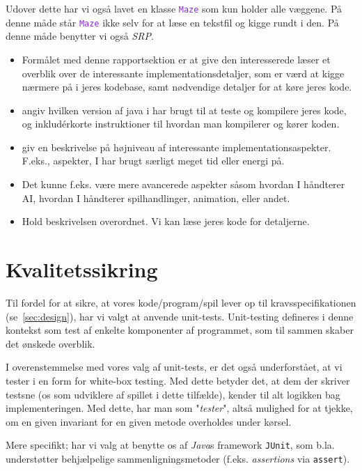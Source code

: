 \documentclass{article}
\newcommand{\code}[1]{\small\texttt{#1}}
\newcommand{\class}[1]{\textcolor{BlueViolet}{\small\texttt{#1}}}
\theoremstyle{mytheoremstyle}
\theoremstyle{mytheoremstyle}
\theoremstyle{myproblemstyle}
\begin{document}
Udover dette har vi også lavet en klasse \class{Maze} som kun holder alle
væggene. På denne måde står \class{Maze} ikke selv for at læse en tekstfil og
kigge rundt i den. På denne måde benytter vi også \textit{SRP}.

\begin{itemize}
  \item Formålet med denne rapportsektion er at give den interesserede læser et
  overblik over de interessante implementationsdetaljer, som er værd at kigge
  nærmere på i jeres kodebase, samt nødvendige detaljer for at køre jeres kode.
  \item angiv hvilken version af java i har brugt til at teste og kompilere
  jeres kode, og inkludérkorte instruktioner til hvordan man kompilerer og kører
  koden.
  \item giv en beskrivelse på højniveau af interessante implementationsaspekter.
  F.eks., aspekter, I har brugt særligt meget tid eller energi på.
  \item Det kunne f.eks. være mere avancerede aspekter såsom hvordan I håndterer
  AI, hvordan I håndterer spilhandlinger, animation, eller andet.
  \item Hold beskrivelsen overordnet. Vi kan læse jeres kode for detaljerne.
\end{itemize}

\newpage
\section{Kvalitetssikring}\label{sec:Kvalitetssikring} %
Til fordel for at sikre, at vores kode/program/spil lever op til
kravsspecifikationen (se \autoref{sec:design}), har vi valgt at anvende
unit-tests. Unit-testing defineres i denne kontekst som test af enkelte
komponenter af programmet, som til sammen skaber det ønskede overblik.

I overenstemmelse med vores valg af unit-tests, er det også underforstået, at vi
tester i en form for white-box testing. Med dette betyder det, at dem der
skriver testsne (os som udviklere af spillet i dette tilfælde), kender til alt
logikken bag implementeringen. Med dette, har man som "\textit{tester}", altså
mulighed for at tjekke, om en given invariant for en given metode overholdes
under kørsel.

Mere specifikt; har vi valg at benytte os af \textit{Java}s framework
\code{JUnit}, som b.la. understøtter behjælpelige sammenligningsmetoder (f.eks.
\textit{assertions} via \code{assert}).
\end{document}
